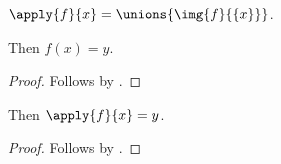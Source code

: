 


\begin{definition}\label{phase5_apply}
    $\apply{f}{x} = \unions{\img{f}{\{x\}}}$.
\end{definition}

\begin{proposition}\label{phase5_application_surface}
    Then $f(x) = y$.
\end{proposition}
\begin{proof}
    Follows by \auto.
\end{proof}

\begin{proposition}\label{phase5_application_explicit}
    Then $\apply{f}{x} = y$.
\end{proposition}
\begin{proof}
    Follows by \auto.
\end{proof}
